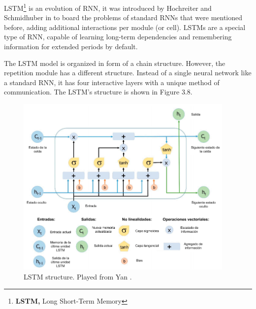 LSTM\footnote{\textbf{LSTM,} Long Short-Term Memory} is an evolution of RNN, it was introduced by Hochreiter and Schmidhuber in \citeyear{Reference52} to board the problems of standard RNNs that were mentioned before, adding additional interactions per module (or cell). LSTMs are a special type of RNN, capable of learning long-term dependencies and remembering information for extended periods by default.

\vspace{5mm} %

The LSTM model is organized in form of a chain structure. However, the repetition module has a different structure. Instead of a single neural network like a standard RNN, it has four interactive layers with a unique method of communication. The LSTM's structure is shown in Figure 3.8.

\begin{figure}[h!]
  \begin{center}	\includegraphics[width=0.95\textwidth, frame]{imagenes/Cap4/lstm}
  \caption{LSTM structure. Played from Yan \protect\cite{Reference54}.} 
  \label{fig:lstm}
  \end{center}
\end{figure}

